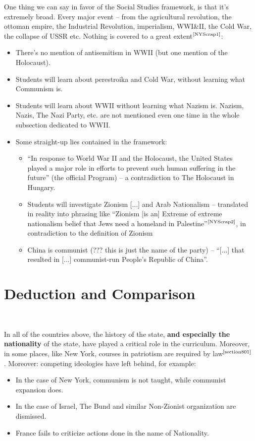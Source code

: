 \documentclass[12pt]{../../../tex/classes/styledArticle}
\newcommand\mc[1]  {$^{\text{\cite{#1}}}$}
\newcommand\aftertitle{\ \!\!\!\!\!\!\!\!\!\!}
\begin{document}
	One thing we can say in favor of the Social Studies framework, is that it's extremely broad. Every major event -- from the agricultural revolution, the ottoman empire, the Industrial Revolution, imperialism, WWI\&II, the Cold War, the collapse of USSR etc. Nothing is covered to a great extent\mc{NYScrap1}: 
	\begin{itemize}
		\item There's no mention of antisemitism in WWII (but one mention of the Holocaust). 
		\item Students will learn about perestroika and Cold War, without learning what Communism is. 
		\item Students will learn about WWII without learning what Nazism is. Nazism, Nazis, The Nazi Party, etc. are not mentioned even one time in the whole subsection dedicated to WWII. 
		\item Some straight-up lies contained in the framework: 
		\begin{itemize}
			\item ``In response to World War II and the Holocaust, the United States played a major role in
			efforts to prevent such human suffering in the future'' (the official Program) -- a contradiction to The Holocaust in Hungary. 
			\item Students will investigate Zionism [...] and Arab Nationalism -- translated in reality into phrasing like ``Zionism [is an] Extreme of extreme nationalism belief that Jews need a homeland in Palestine''\mc{NYScrap2}, in contradiction to the definition of Zionism 
			\item China is communist (??? this is just the name of the party) -- ``[...] that resulted in [...]  communist-run People’s Republic of China''. 
		\end{itemize}
	\end{itemize}
	
	\section{Deduction and Comparison}\aftertitle
	
	\gothstart In all of the countries above, the history of the state, \textbf{and especially the nationality} of the state, have played a critical role in the curriculum. Moreover, in some places, like New York, courses in patriotism are required by law\mc{section801}. 
	Moreover: competing ideologies have left behind, for example:
	\begin{itemize}
		\item In the case of New York, communism is not taught, while communist expansion does. 
		\item In the case of Israel, The Bund and similar Non-Zionist organization are dismissed. 
		\item France fails to criticize actions done in the name of Nationality. 
	\end{itemize}
	
\end{document}
